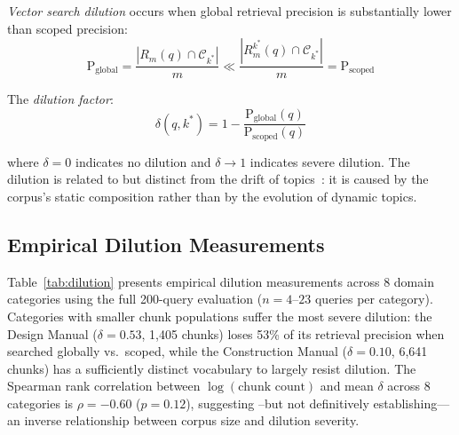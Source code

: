 \documentclass{article}
\newcommand{\numQueries}{200}
\begin{document}
\textit{Vector search dilution} occurs when global retrieval precision is substantially lower than scoped precision:
\begin{equation}
\text{P}_{\text{global}} = \frac{|R_m(q) \cap \mathcal{C}_{k^*}|}{m} \ll \frac{|R_m^{k^*}(q) \cap \mathcal{C}_{k^*}|}{m} = \text{P}_{\text{scoped}}
\end{equation}

The \textit{dilution factor}:
\begin{equation}
\delta(q, k^*) = 1 - \frac{\text{P}_{\text{global}}(q)}{\text{P}_{\text{scoped}}(q)}
\label{eq:dilution}
\end{equation}

where $\delta = 0$ indicates no dilution and $\delta \rightarrow 1$ indicates severe dilution. The dilution is related to but distinct from the drift of topics~\citep{allan2002tdt}: it is caused by the corpus's static composition rather than by the evolution of dynamic topics.

\subsection{Empirical Dilution Measurements}

Table~\ref{tab:dilution} presents empirical dilution measurements across 8 domain categories using the full \numQueries{}-query evaluation ($n = 4$--$23$ queries per category). Categories with smaller chunk populations suffer the most severe dilution: the Design Manual ($\delta = 0.53$, 1,405 chunks) loses 53\% of its retrieval precision when searched globally vs.\ scoped, while the Construction Manual ($\delta = 0.10$, 6,641 chunks) has a sufficiently distinct vocabulary to largely resist dilution. The Spearman rank correlation between $\log(\text{chunk count})$ and mean $\delta$ across 8 categories is $\rho = -0.60$ ($p = 0.12$), suggesting --but not definitively establishing---an inverse relationship between corpus size and dilution severity.
\end{document}
